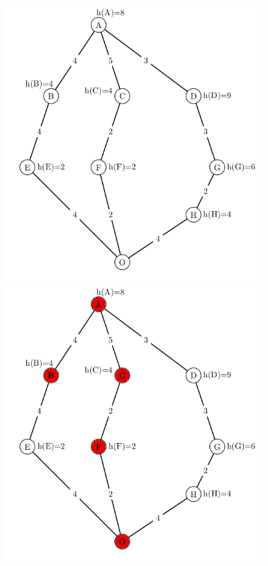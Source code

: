 \begin{figure}[!htb]
  \includegraphics[width=\linewidth]{images/hachefull-left}
\endminipage\hfill
{}
  \includegraphics[width=\linewidth]{images/hachefullabcfG-right}

\end{figure}

